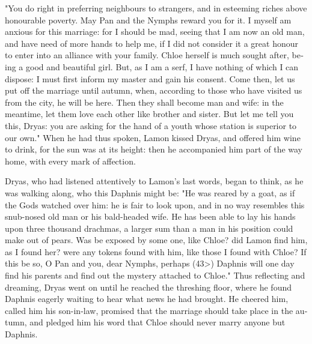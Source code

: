 \documentclass{book}
\begin{document}
\begin{pairs}
\begin{Rightside}
\begin{english}
  "You do right in preferring neighbours to strangers, and in esteeming riches above honourable poverty.  May Pan and the Nymphs reward you for it.  I myself am anxious for this marriage: for I should be mad, seeing that I am now an old man, and have need of more hands to help me, if I did not consider it a great honour to enter into an alliance with your family.  Chloe herself is much sought after, being a good and beautiful girl.  But, as I am a serf, I have nothing of which I can dispose: I must first inform my master and gain his consent.  Come then, let us put off the marriage until autumn, when, according to those who have visited us from the city, he will be here.  Then they shall become man and wife: in the meantime, let them love each other like brother and sister.  But let me tell you this, Dryas: you are asking for the hand of a youth whose station is superior to our own."  When he had thus spoken, Lamon kissed Dryas, and offered him wine to drink, for the sun was at its height: then he accompanied him part of the way home, with every mark of affection.
\pend


  Dryas, who had listened attentively to Lamon's last words, began to think, as he was walking along, who this Daphnis might be: "He was reared by a goat, as if the Gods watched over him: he is fair to look upon, and in no way resembles this snub-nosed old man or his bald-headed wife.  He has been able to lay his hands upon three thousand drachmas, a larger sum than a man in his position could make out of pears.  Was be exposed by some one, like Chloe? did Lamon find him, as I found her? were any tokens found with him, like those I found with Chloe?  If this be so, O Pan and you, dear Nymphs, perhaps (43>) Daphnis will one day find his parents and find out the mystery attached to Chloe."  Thus reflecting and dreaming, Dryas went on until he reached the threshing floor, where he found Daphnis eagerly waiting to hear what news he had brought.  He cheered him, called him his son-in-law, promised that the marriage should take place in the autumn, and pledged him his word that Chloe should never marry anyone but Daphnis.
\pend



\end{english}
\end{Rightside}
\end{pairs}
\end{document}
